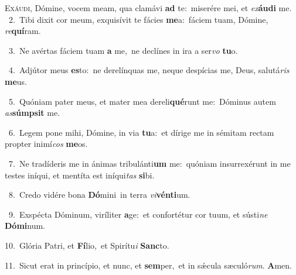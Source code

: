 \lettrine{\initial\textcolor{\initialcolor}{E}}{xáudi,} Dómine, vocem meam, qua clamávi \textbf{ad} te:~\star miserére mei, et \textit{ex}\-\textbf{áu}\textbf{di} me.\\
{\numbfont\textcolor{\numbcolor}{~2.}}~Tibi dixit cor meum, exquisívit te fácies \textbf{me}\-a:~\star fáciem tuam, Dómine, \textit{re}\-\textbf{quí}ram.\par
{\numbfont\textcolor{\numbcolor}{~3.}}~Ne avértas fáciem tuam \textbf{a} me,~\star ne declínes in ira a ser\textit{vo} \textbf{tu}\-o.\par
{\numbfont\textcolor{\numbcolor}{~4.}}~Adjútor meus \textbf{es}\-to:~\star ne derelínquas me, neque despícias me, Deus, salutá\textit{ris} \textbf{me}\-us.\par
{\numbfont\textcolor{\numbcolor}{~5.}}~Quóniam pater meus, et mater mea dereli\-\textbf{qué}\-runt me:~\star Dóminus autem \textit{as}\-\textbf{súmp}\textbf{sit} me.\par
{\numbfont\textcolor{\numbcolor}{~6.}}~Legem pone mihi, Dómine, in via \textbf{tu}\-a:~\star et dírige me in sémitam rectam propter inimí\textit{cos} \textbf{me}\-os.\par
{\numbfont\textcolor{\numbcolor}{~7.}}~Ne tradíderis me in ánimas tribulánti\textbf{um} me:~\star quóniam insurrexérunt in me testes iníqui, et mentíta est iníqui\textit{tas} \textbf{si}\-bi.\par
{\numbfont\textcolor{\numbcolor}{~8.}}~Credo vidére bona \textbf{Dó}\-mini~\star in terra \textit{vi}\-\textbf{vén}\textbf{ti}um.\par
{\numbfont\textcolor{\numbcolor}{~9.}}~Exspécta Dóminum, viríliter \textbf{a}\-ge:~\star et confortétur cor tuum, et sústi\textit{ne} \textbf{Dó}\-\textbf{mi}num.\par
{\numbfont\textcolor{\numbcolor}{10.}}~Glória Patri, et \textbf{Fí}\-lio,~\star et Spirítu\textit{i} \textbf{Sanc}\-to.\par
{\numbfont\textcolor{\numbcolor}{11.}}~Sicut erat in princípio, et nunc, et \textbf{sem}\-per,~\star et in sǽcula sæculó\-\textit{rum}\-. \textbf{A}\-men.\par
